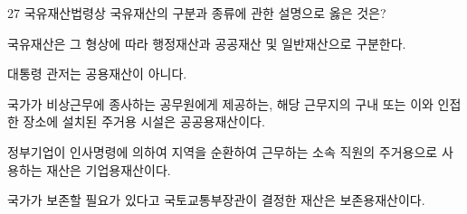 \begin{question}{27}
국유재산법령상 국유재산의 구분과 종류에 관한 설명으로 옳은 것은?
\begin{choices}
  \item 국유재산은 그 형상에 따라 행정재산과 공공재산 및 일반재산으로 구분한다.
  \item 대통령 관저는 공용재산이 아니다.
  \item 국가가 비상근무에 종사하는 공무원에게 제공하는, 해당 근무지의 구내 또는 이와 인접한 장소에 설치된 주거용 시설은 공공용재산이다.
  \item 정부기업이 인사명령에 의하여 지역을 순환하여 근무하는 소속 직원의 주거용으로 사용하는 재산은 기업용재산이다.
  \item 국가가 보존할 필요가 있다고 국토교통부장관이 결정한 재산은 보존용재산이다.
\end{choices}
\end{question}
